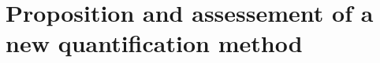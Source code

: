 \cleardoublepage
\part{Proposition and assessement of a new quantification method}\label{part:part3}






\newpage

